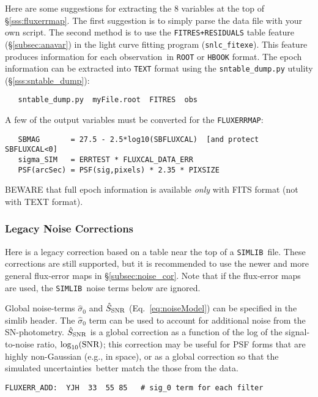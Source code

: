 \documentclass[12pt]{article}
\newcommand{\uncs}{uncertainties}
\newcommand{\simlib}{{\tt SIMLIB}}
\newcommand{\obs}{observation}
\newcommand{\sigOFF}{\hat\sigma_0}
\newcommand{\SSNR}{\hat{S}_{\rm SNR}}
\newcommand{\logSNR}{\log_{10}({\rm SNR})}
\begin{document}
{Here are some suggestions for extracting the 8 variables
at the top of \S\ref{sss:fluxerrmap}. The first suggestion
is to simply parse the data file with your own script.
The second method is to use the {\tt FITRES+RESIDUALS} table
feature (\S\ref{subsec:anavar}) 
in the light curve fitting program ({\tt snlc\_fitexe}).
This feature produces information
for each \obs\ in {\tt ROOT} or {\tt HBOOK} format.
The epoch information can be extracted into {\tt TEXT} format
using the {\tt sntable\_dump.py} utulity (\S\ref{sss:sntable_dump}):
\begin{verbatim}
   sntable_dump.py  myFile.root  FITRES  obs
\end{verbatim}
A few of the output variables must be converted for the
{\tt FLUXERRMAP}:
%
\begin{verbatim}
   SBMAG       = 27.5 - 2.5*log10(SBFLUXCAL)  [and protect SBFLUXCAL<0]
   sigma_SIM   = ERRTEST * FLUXCAL_DATA_ERR
   PSF(arcSec) = PSF(sig,pixels) * 2.35 * PIXSIZE
\end{verbatim}
%
BEWARE that full epoch information is available {\it only}
with FITS format (not with TEXT format).

\clearpage
\subsubsection{ Legacy Noise Corrections }
\label{sss:noise_cor_legacy}

Here is a legacy correction based on a table near the top
of a \simlib\ file. These corrections are still supported,
but it is recommended to use the newer and more general
flux-error maps in \S\ref{subsec:noise_cor}.
Note that if the flux-error maps are used, the \simlib\ noise
terms below are ignored.

Global noise-terms $\sigOFF$ and $\SSNR$ (Eq.~\ref{eq:noiseModel})
can be specified in the simlib header.
The $\sigOFF$ term can be used to account for
additional noise from the SN-photometry.
$\SSNR$ is a global correction as a function of
the log of the signal-to-noise ratio, $\logSNR$;
this correction may be useful for PSF forms
that are highly non-Gaussian (e.g., in space),
or as a global correction so that the simulated
\uncs\ better match the those from the data.

%
\begin{Verbatim}[frame=single]
FLUXERR_ADD:  YJH  33  55 85   # sig_0 term for each filter


\end{Verbatim}}
\end{document}

